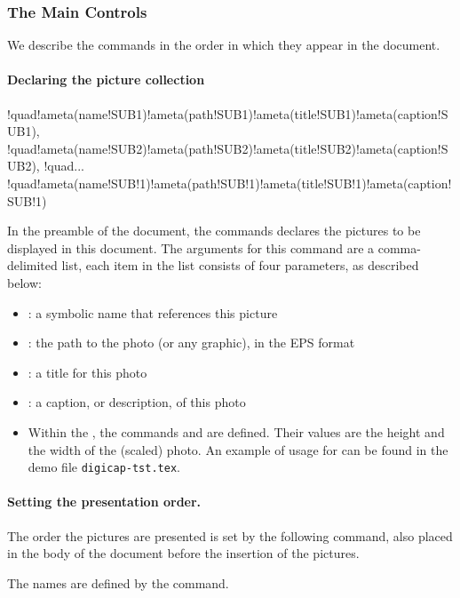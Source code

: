 \documentclass{article}
\begin{document}
\subsubsection{The Main Controls}\label{photoAlbum}

We describe the commands in the order in which they appear in the
document.

\paragraph*{Declaring the picture collection}\leavevmode
\bVerb{}%
\begin{dCmd*}[commandchars=!()]{\bxSize}
\PicsThisDoc
{%
!quad{!ameta(name!SUB1)}{!ameta(path!SUB1)}{!ameta(title!SUB1)}{!ameta(caption!SUB1)},
!quad{!ameta(name!SUB2)}{!ameta(path!SUB2)}{!ameta(title!SUB2)}{!ameta(caption!SUB2)},
!quad...
!quad{!ameta(name!SUB!1)}{!ameta(path!SUB!1)}{!ameta(title!SUB!1)}{!ameta(caption!SUB!1)}
}
\end{dCmd*}
\eVerb
In the preamble of the document, the  commands declares
the pictures to be displayed in this document. The arguments for this command
are a comma-delimited list, each item in the list consists of four parameters, as described
below:
\begin{itemize}
  \item {}: a symbolic name that references this picture
  \item {}: the path to the photo (or any graphic), in the EPS format
  \item {}: a title for this photo
  \item {}: a caption, or description, of this photo

  \item[] Within the , the commands
       and  are
      defined. Their values are the height and the width of the (scaled)
      photo. An example of usage for  can be found in the
      demo file \texttt{digicap-tst.tex}.
\end{itemize}

\paragraph*{Setting the presentation order.} The order the pictures are presented is set by the following command, also
placed in the body of the document before the insertion of the pictures.
\bVerb\def\1{n}\takeMeasure{\string\presentationOrder\darg{\ameta{name\SUB1},\ameta{name\SUB2},...,\ameta{name\SUB\1}}}%
\begin{dCmd*}[commandchars=!()]{\bxSize}
\end{dCmd*}
\eVerb The names are defined by the  command.
\end{document}
